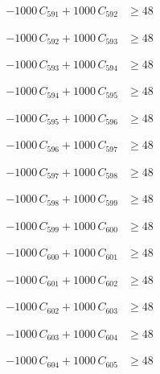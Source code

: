 \documentclass[a4paper,11pt]{article}
\begin{document}
\begin{align}
-1000\,C_{591} + 1000\,C_{592} &\geq 48 \nonumber
\end{align}

\begin{align}
-1000\,C_{592} + 1000\,C_{593} &\geq 48 \nonumber
\end{align}

\begin{align}
-1000\,C_{593} + 1000\,C_{594} &\geq 48 \nonumber
\end{align}

\begin{align}
-1000\,C_{594} + 1000\,C_{595} &\geq 48 \nonumber
\end{align}

\begin{align}
-1000\,C_{595} + 1000\,C_{596} &\geq 48 \nonumber
\end{align}

\begin{align}
-1000\,C_{596} + 1000\,C_{597} &\geq 48 \nonumber
\end{align}

\begin{align}
-1000\,C_{597} + 1000\,C_{598} &\geq 48 \nonumber
\end{align}

\begin{align}
-1000\,C_{598} + 1000\,C_{599} &\geq 48 \nonumber
\end{align}

\begin{align}
-1000\,C_{599} + 1000\,C_{600} &\geq 48 \nonumber
\end{align}

\begin{align}
-1000\,C_{600} + 1000\,C_{601} &\geq 48 \nonumber
\end{align}

\begin{align}
-1000\,C_{601} + 1000\,C_{602} &\geq 48 \nonumber
\end{align}

\begin{align}
-1000\,C_{602} + 1000\,C_{603} &\geq 48 \nonumber
\end{align}

\begin{align}
-1000\,C_{603} + 1000\,C_{604} &\geq 48 \nonumber
\end{align}

\begin{align}
-1000\,C_{604} + 1000\,C_{605} &\geq 48 \nonumber
\end{align}
\end{document}
